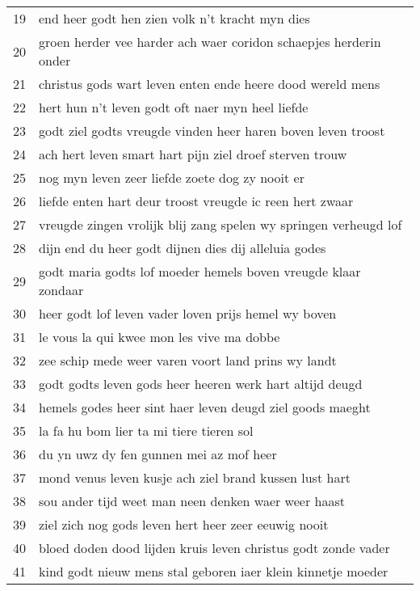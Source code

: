 \begin{longtable}{p{} | p{}}
	19    & end heer godt hen zien volk n't kracht myn dies                   \\
	20    & groen herder vee harder ach waer coridon schaepjes herderin onder \\
	21    & christus gods wart leven enten ende heere dood wereld mens        \\
	22    & hert hun n't leven godt oft naer myn heel liefde                  \\
	23    & godt ziel godts vreugde vinden heer haren boven leven troost      \\
	24    & ach hert leven smart hart pijn ziel droef sterven trouw           \\
	25    & nog myn leven zeer liefde zoete dog zy nooit er                   \\
	26    & liefde enten hart deur troost vreugde ic reen hert zwaar          \\
	27    & vreugde zingen vrolijk blij zang spelen wy springen verheugd lof  \\
	28    & dijn end du heer godt dijnen dies dij alleluia godes              \\
	29    & godt maria godts lof moeder hemels boven vreugde klaar zondaar    \\
	30    & heer godt lof leven vader loven prijs hemel wy boven              \\
	31    & le vous la qui kwee mon les vive ma dobbe                         \\
	32    & zee schip mede weer varen voort land prins wy landt               \\
	33    & godt godts leven gods heer heeren werk hart altijd deugd          \\
	34    & hemels godes heer sint haer leven deugd ziel goods maeght         \\
	35    & la fa hu bom lier ta mi tiere tieren sol                          \\
	36    & du yn uwz dy fen gunnen mei az mof heer                           \\
	37    & mond venus leven kusje ach ziel brand kussen lust hart            \\
	38    & sou ander tijd weet man neen denken waer weer haast               \\
	39    & ziel zich nog gods leven hert heer zeer eeuwig nooit              \\
	40    & bloed doden dood lijden kruis leven christus godt zonde vader     \\
	41    & kind godt nieuw mens stal geboren iaer klein kinnetje moeder      \\

\end{longtable}
